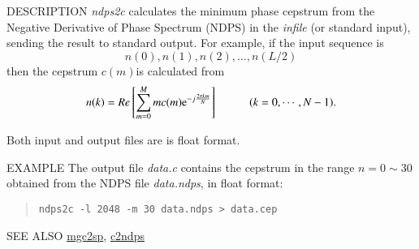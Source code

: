 \begin{synopsis}
 \item[ndps2c] [ --m $M$ ] [ --l $L$ ] [ {\em infile} ]
\end{synopsis}

\begin{qsection}{DESCRIPTION}
{\em ndps2c} calculates the minimum phase cepstrum 
from the Negative Derivative of Phase Spectrum (NDPS)
in the {\em infile} (or standard input), 
sending the result to standard output.
For example, if the input sequence is
\begin{displaymath}
   n(0),n(1),n(2),\dots,n(L/2)
\end{displaymath}
then the cepstrum $c(m)$is calculated from
\begin{displaymath}
 n(k) = Re \left[ \sum^{M}_{m=0}mc(m)\mathrm{e}^{-j\frac{2\pi km}{N}} \right]\hspace{10mm} (k=0,\cdots,N-1).
\end{displaymath}

Both input and output files are is float format.

\end{qsection}

\begin{options}
\end{options}

\begin{qsection}{EXAMPLE}
The output file {\em data.c} contains the cepstrum
in the range $n = 0 \sim 30$ obtained from the NDPS
 file {\em data.ndps}, in float format:
 \begin{quote}
  \verb!ndps2c -l 2048 -m 30 data.ndps > data.cep!
 \end{quote}
\end{qsection}

\begin{qsection}{SEE ALSO}
\hyperlink{mgc2sp}{mgc2sp},
\hyperlink{c2ndps}{c2ndps}
\end{qsection}

